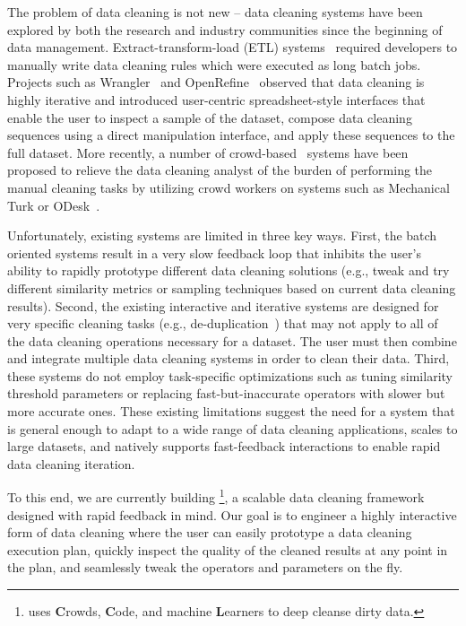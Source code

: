 The problem of data cleaning is not new -- data cleaning systems have been
explored by both the research and industry communities since the beginning of data management.
Extract-transform-load (ETL) systems~\cite{informatica,talend,nadeef,apachefalcon}
required developers to manually write data cleaning rules which were executed as 
long batch jobs.
Projects such as Wrangler~\cite{wrangler,trifacta} and
OpenRefine~\cite{openrefine} observed that data cleaning is highly iterative and
introduced user-centric spreadsheet-style interfaces that enable the user to inspect a sample of the dataset, 
compose data cleaning sequences using a direct manipulation interface, and apply these sequences to the full dataset.   
More recently, a number of crowd-based~\cite{gokhale2014corleone,stonebraker2013data}
systems have been proposed to relieve the data cleaning analyst of the burden of performing the manual cleaning tasks
by utilizing crowd workers on systems such as Mechanical Turk or ODesk~\cite{argonaut}.

Unfortunately, existing systems are limited in three key ways.
First, the batch oriented systems result in a very slow feedback loop 
that inhibits the user's ability to rapidly prototype different data cleaning solutions (e.g., tweak and 
try different similarity metrics or sampling techniques based on current data cleaning results).
Second, the existing interactive and iterative systems are designed for very specific cleaning tasks 
(e.g., de-duplication~\cite{gokhale2014corleone,park2014crowdfill,eracer,chen2014integrating}) that may not apply to all of the data 
cleaning operations necessary for a dataset.  The user must then combine and integrate multiple
data cleaning systems in order to clean their data.
Third, these systems do not employ task-specific optimizations
such as tuning similarity threshold parameters or replacing fast-but-inaccurate operators with slower but more accurate ones.
These existing limitations suggest the need for a system that is general enough to
adapt to a wide range of data cleaning applications, scales to large datasets, 
and natively supports fast-feedback interactions to enable rapid data cleaning iteration.

To this end, we are currently building \sys\footnote{{\scriptsize \sys uses {\bf C}rowds, {\bf C}ode, and machine {\bf L}earners to deep cleanse dirty data.}}, 
a scalable data cleaning framework designed with rapid feedback in mind.  Our goal is to
engineer a highly interactive form of data cleaning where the user can easily prototype a data cleaning execution plan,
quickly inspect the quality of the cleaned results at any point in the plan, and seamlessly
tweak the operators and parameters on the fly.

